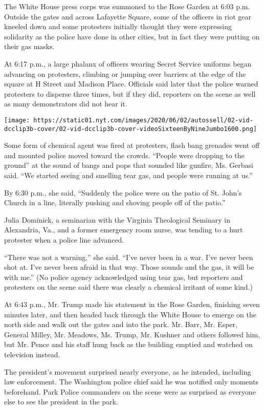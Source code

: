 The White House press corps was summoned to the Rose Garden at 6:03 p.m.
Outside the gates and across Lafayette Square, some of the officers in
riot gear kneeled down and some protesters initially thought they were
expressing solidarity as the police have done in other cities, but in
fact they were putting on their gas masks.

At 6:17 p.m., a large phalanx of officers wearing Secret Service
uniforms began advancing on protesters, climbing or jumping over
barriers at the edge of the square at H Street and Madison Place.
Officials said later that the police warned protesters to disperse three
times, but if they did, reporters on the scene as well as many
demonstrators did not hear it.

\texttt{[image: https://static01.nyt.com/images/2020/06/02/autossell/02-vid-dcclip3b-cover/02-vid-dcclip3b-cover-videoSixteenByNineJumbo1600.png]}

Some form of chemical agent was fired at protesters, flash bang grenades
went off and mounted police moved toward the crowds. ``People were
dropping to the ground'' at the sound of bangs and pops that sounded
like gunfire, Ms. Gerbasi said. ``We started seeing and smelling tear
gas, and people were running at us.''

By 6:30 p.m., she said, ``Suddenly the police were on the patio of St.
John's Church in a line, literally pushing and shoving people off of the
patio.''

Julia Dominick, a seminarian with the Virginia Theological Seminary in
Alexandria, Va., and a former emergency room nurse, was tending to a
hurt protester when a police line advanced.

``There was not a warning,'' she said. ``I've never been in a war. I've
never been shot at. I've never been afraid in that way. Those sounds and
the gas, it will be with me.'' (No police agency acknowledged using tear
gas, but reporters and protesters on the scene said there was clearly a
chemical irritant of some kind.)

At 6:43 p.m., Mr. Trump made his statement in the Rose Garden, finishing
seven minutes later, and then headed back through the White House to
emerge on the north side and walk out the gates and into the park. Mr.
Barr, Mr. Esper, General Milley, Mr. Meadows, Ms. Trump, Mr. Kushner and
others followed him, but Mr. Pence and his staff hung back as the
building emptied and watched on television instead.

The president's movement surprised nearly everyone, as he intended,
including law enforcement. The Washington police chief said he was
notified only moments beforehand. Park Police commanders on the scene
were as surprised as everyone else to see the president in the park.

